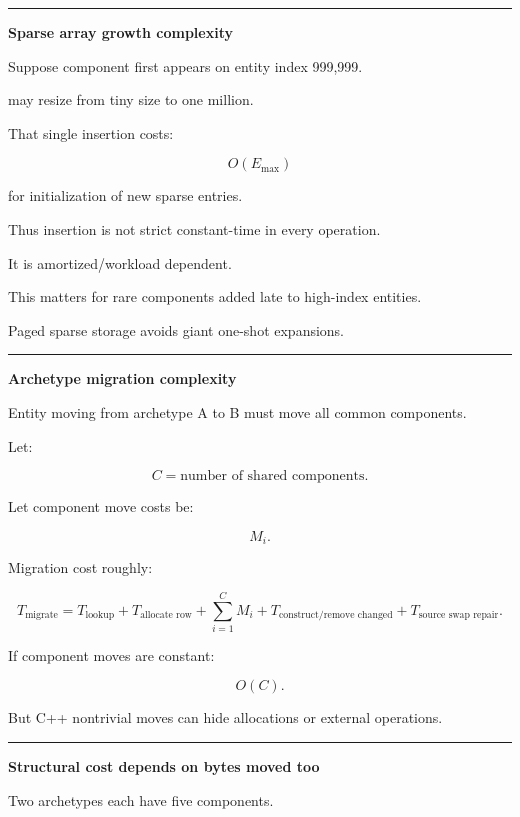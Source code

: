 \begin{center}\rule{0.5\linewidth}{0.5pt}\end{center}

\textbf{Sparse array growth complexity}

Suppose component first appears on entity index 999,999.

 may resize from tiny size to one million.

That single insertion costs:

\[
O(E_{\max})
\]

for initialization of new sparse entries.

Thus insertion is not strict constant-time in every operation.

It is amortized/workload dependent.

This matters for rare components added late to high-index entities.

Paged sparse storage avoids giant one-shot expansions.

\begin{center}\rule{0.5\linewidth}{0.5pt}\end{center}

\textbf{Archetype migration complexity}

Entity moving from archetype A to B must move all common components.

Let:

\[
C=
\text{number of shared components}.
\]

Let component move costs be:

\[
M_i.
\]

Migration cost roughly:

\[
\boxed{
T_{\text{migrate}}
=
T_{\text{lookup}}
+
T_{\text{allocate row}}
+
\sum_{i=1}^{C}M_i
+
T_{\text{construct/remove changed}}
+
T_{\text{source swap repair}}.
}
\]

If component moves are constant:

\[
O(C).
\]

But C++ nontrivial moves can hide allocations or external operations.

\begin{center}\rule{0.5\linewidth}{0.5pt}\end{center}

\textbf{Structural cost depends on bytes moved too}

Two archetypes each have five components.


